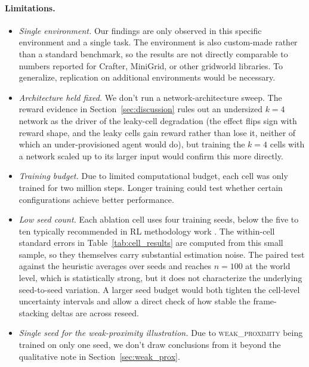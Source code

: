 \documentclass[12pt,a4paper,titlepage]{article}
\begin{document}
\paragraph{Limitations.}
\begin{itemize}[nosep,leftmargin=1.6em]
  \item \emph{Single environment.} Our findings are only observed in this specific environment and a single task. The environment is also custom-made rather than a standard benchmark, so the results are not directly comparable to numbers reported for Crafter, MiniGrid, or other gridworld libraries. To generalize, replication on additional environments would be necessary.
  \item \emph{Architecture held fixed.} We don't run a network-architecture sweep. The reward evidence in Section~\ref{sec:discussion} rules out an undersized $k=4$ network as the driver of the leaky-cell degradation (the effect flips sign with reward shape, and the leaky cells gain reward rather than lose it, neither of which an under-provisioned agent would do), but training the $k=4$ cells with a network scaled up to its larger input would confirm this more directly.
  \item \emph{Training budget.} Due to limited computational budget, each cell was only trained for two million steps. Longer training could test whether certain configurations achieve better performance.
  \item \emph{Low seed count.} Each ablation cell uses four training seeds, below the five to ten typically recommended in RL methodology work \citep{Henderson2018, Colas2018}. The within-cell standard errors in Table~\ref{tab:cell_results} are computed from this small sample, so they themselves carry substantial estimation noise. The paired test against the heuristic averages over seeds and reaches $n = 100$ at the world level, which is statistically strong, but it does not characterize the underlying seed-to-seed variation. A larger seed budget would both tighten the cell-level uncertainty intervals and allow a direct check of how stable the frame-stacking deltas are across reseed.
  \item \emph{Single seed for the weak-proximity illustration.} Due to \textsc{weak\_proximity} being trained on only one seed, we don't draw conclusions from it beyond the qualitative note in Section~\ref{sec:weak_prox}.
\end{itemize}

\end{document}
